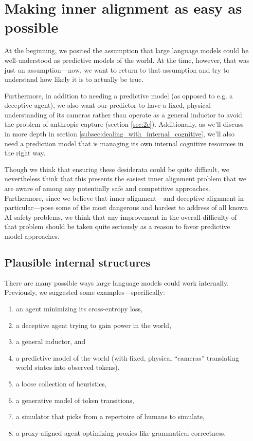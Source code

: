 \documentclass[
  onecolumn,
  natbib,
]{miri-tech-article}
\begin{document}
\section{Making inner alignment as easy as possible}
\label{sec:4}

At the beginning, we posited the assumption that large language models could be well-understood as predictive models of the world. At the time, however, that was just an assumption---now, we want to return to that assumption and try to understand how likely it is to actually be true.

Furthermore, in addition to needing a predictive model (as opposed to e.g. a deceptive agent), we also want our predictor to have a fixed, physical understanding of its cameras rather than operate as a general inductor to avoid the problem of anthropic capture (section \ref{sec:2e}). Additionally, as we'll discuss in more depth in section \ref{subsec:dealing_with_internal_cognitive}, we'll also need a prediction model that is managing its own internal cognitive resources in the right way.

Though we think that ensuring these desiderata could be quite difficult, we nevertheless think that this presents the easiest inner alignment problem that we are aware of among any potentially safe and competitive approaches\cite{11_proposals}. Furthermore, since we believe that inner alignment---and deceptive alignment in particular---pose some of the most dangerous and hardest to address of all known AI safety problems\cite{risks}, we think that any improvement in the overall difficulty of that problem should be taken quite seriously as a reason to favor predictive model approaches.


\subsection{Plausible internal structures}

There are many possible ways large language models could work internally. Previously, we suggested some examples---specifically:



\begin{enumerate}
\item an agent minimizing its cross-entropy loss,
\item a deceptive agent trying to gain power in the world,
\item a general inductor, and
\item a predictive model of the world (with fixed, physical ``cameras'' translating world states into observed tokens).
\item a loose collection of heuristics,
\item a generative model of token transitions,
\item a simulator that picks from a repertoire of humans to simulate,
\item a proxy-aligned agent optimizing proxies like grammatical correctness,
\end{enumerate}
\end{document}
